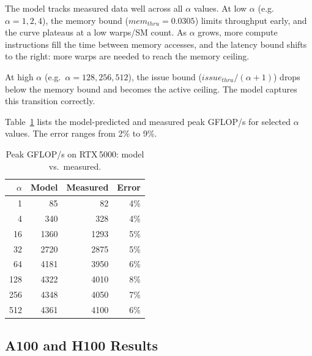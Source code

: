 The model tracks measured data well across all $\alpha$ values.
At low $\alpha$ (e.g.\ $\alpha = 1, 2, 4$), the memory bound
($mem_{thru} = 0.0305$) limits throughput early, and the curve plateaus
at a low warps/SM count.
As $\alpha$ grows, more compute instructions fill the time between memory
accesses, and the latency bound shifts to the right: more warps are needed to
reach the memory ceiling.

At high $\alpha$ (e.g.\ $\alpha = 128, 256, 512$), the issue bound
($issue_{thru}/(\alpha+1)$) drops below the memory bound and becomes the
active ceiling.
The model captures this transition correctly.

Table~\ref{tab:rtx5000_peaks} lists the model-predicted and measured peak
GFLOP/s for selected $\alpha$ values.
The error ranges from 2\% to 9\%.

\begin{table}[t]
  \centering
  \caption{Peak GFLOP/s on RTX\,5000: model vs.\ measured.}
  \label{tab:rtx5000_peaks}
  \begin{tabular}{rrrr}
    \toprule
    $\alpha$ & Model & Measured & Error \\
    \midrule
    1   & 85    & 82   & 4\% \\
    4   & 340   & 328  & 4\% \\
    16  & 1360  & 1293 & 5\% \\
    32  & 2720  & 2875 & 5\% \\
    64  & 4181  & 3950 & 6\% \\
    128 & 4322  & 4010 & 8\% \\
    256 & 4348  & 4050 & 7\% \\
    512 & 4361  & 4100 & 6\% \\
    \bottomrule
  \end{tabular}
\end{table}


\subsection{A100 and H100 Results}
\label{subsec:a100_h100_results}


